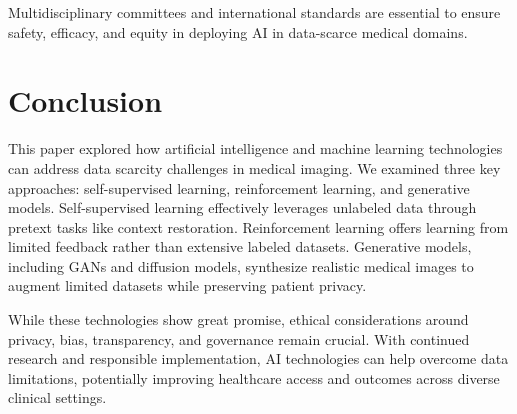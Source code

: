 \documentclass{article}
\begin{document}
Multidisciplinary committees and international standards are essential to ensure safety, efficacy, and equity in deploying AI in data-scarce medical domains.

\section{Conclusion}
\label{sec:conc}

This paper explored how artificial intelligence and machine learning technologies can address data scarcity challenges in medical imaging. We examined three key approaches: self-supervised learning, reinforcement learning, and generative models. Self-supervised learning effectively leverages unlabeled data through pretext tasks like context restoration. Reinforcement learning offers learning from limited feedback rather than extensive labeled datasets. Generative models, including GANs and diffusion models, synthesize realistic medical images to augment limited datasets while preserving patient privacy. 

While these technologies show great promise, ethical considerations around privacy, bias, transparency, and governance remain crucial. With continued research and responsible implementation, AI technologies can help overcome data limitations, potentially improving healthcare access and outcomes across diverse clinical settings.


\vfill\pagebreak



\end{document}
